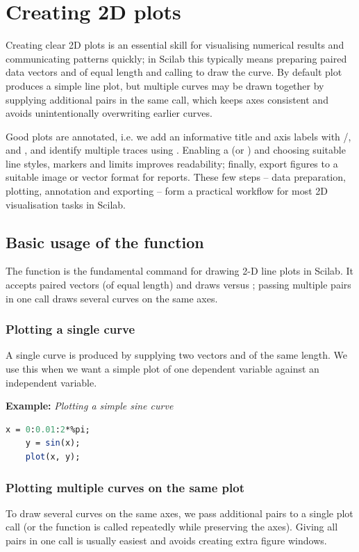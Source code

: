 \section{Creating 2D plots}
	Creating clear 2D plots is an essential skill for visualising numerical results and communicating patterns quickly; in Scilab this typically means preparing paired data vectors  and  of equal length and calling  to draw the curve. By default plot produces a simple line plot, but multiple curves may be drawn together by supplying additional  pairs in the same call, which keeps axes consistent and avoids unintentionally overwriting earlier curves.
	
	Good plots are annotated, i.e. we add an informative title and axis labels with /,  and , and identify multiple traces using . Enabling a  (or ) and choosing suitable line styles, markers and limits improves readability; finally, export figures to a suitable image or vector format for reports. These few steps -- data preparation, plotting, annotation and exporting -- form a practical workflow for most 2D visualisation tasks in Scilab.
	
	\subsection{Basic usage of the  function}
		The  function is the fundamental command for drawing 2-D line plots in Scilab. It accepts paired  vectors (of equal length) and draws  versus ; passing multiple  pairs in one call draws several curves on the same axes.
	
	\subsubsection*{Plotting a single curve}
		A single curve is produced by supplying two vectors  and  of the same length. We use this when we want a simple plot of one dependent variable against an independent variable.
		
		\textbf{Example:} \textit{Plotting a simple sine curve}
		\begin{lstlisting}[language=Scilab]
	x = 0:0.01:2*%pi;
	y = sin(x);
	plot(x, y);
		\end{lstlisting}
	
	\subsubsection*{Plotting multiple curves on the same plot}
		To draw several curves on the same axes, we pass additional  pairs to a single plot call (or the  function is called repeatedly while preserving the axes). Giving all pairs in one call is usually easiest and avoids creating extra figure windows.
	
